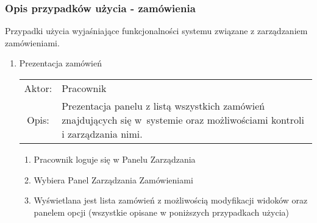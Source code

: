 \subsubsection{Opis przypadków użycia - zamówienia}

Przypadki użycia wyjaśniające funkcjonalności systemu związane z zarządzaniem
zamówieniami.

\begin{enumerate}
  \item Prezentacja zamówień\\
  \begin{tabularx}{\linewidth}{ c X }
  Aktor: & Pracownik \\
  Opis: & Prezentacja panelu z listą wszystkich zamówień znajdujących się w~systemie
  oraz możliwościami kontroli i zarządzania nimi.\\
  \end{tabularx}
	\begin{enumerate}
	  \item Pracownik loguje się w Panelu Zarządzania
	  \item Wybiera Panel Zarządzania Zamówieniami
	  \item Wyświetlana jest lista zamówień z możliwością modyfikacji widoków
	  oraz panelem opcji (wszystkie opisane w poniższych przypadkach użycia)
	\end{enumerate}


\end{enumerate}
